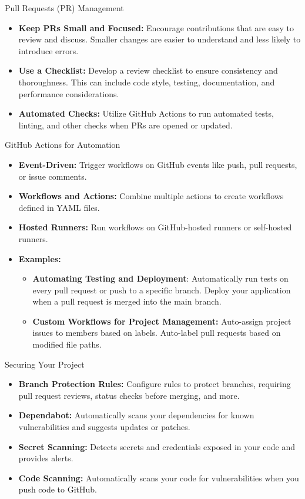 \documentclass[aspectratio=169]{beamer}
\begin{document}
\begin{frame}{Pull Requests (PR) Management}
\begin{itemize}
    \item \textbf{Keep PRs Small and Focused:} Encourage contributions that are easy to review and discuss. Smaller changes are easier to understand and less likely to introduce errors.
    \item \textbf{Use a Checklist:} Develop a review checklist to ensure consistency and thoroughness. This can include code style, testing, documentation, and performance considerations.
    \item \textbf{Automated Checks:} Utilize GitHub Actions to run automated tests, linting, and other checks when PRs are opened or updated.
\end{itemize}
\end{frame}
\begin{frame}{GitHub Actions for Automation}
\begin{itemize}
    \item \textbf{Event-Driven:} Trigger workflows on GitHub events like push, pull requests, or issue comments.
    \item \textbf{Workflows and Actions:} Combine multiple actions to create workflows defined in YAML files.
    \item \textbf{Hosted Runners:} Run workflows on GitHub-hosted runners or self-hosted runners.
    \item \textbf{Examples:}
    \begin{itemize}
        \item \textbf{Automating Testing and Deployment}: Automatically run tests on every pull request or push to a specific branch. Deploy your application when a pull request is merged into the main branch.
        \item \textbf{Custom Workflows for Project Management:} Auto-assign project issues to members based on labels. Auto-label pull requests based on modified file paths.
    \end{itemize}
\end{itemize}
\end{frame}
\begin{frame}{Securing Your Project}
\begin{itemize}
    \item \textbf{Branch Protection Rules:} Configure rules to protect branches, requiring pull request reviews, status checks before merging, and more.
    \item \textbf{Dependabot:} Automatically scans your dependencies for known vulnerabilities and suggests updates or patches.
    \item \textbf{Secret Scanning:} Detects secrets and credentials exposed in your code and provides alerts.
    \item \textbf{Code Scanning:} Automatically scans your code for vulnerabilities when you push code to GitHub.
\end{itemize}
\end{frame}
\end{document}
